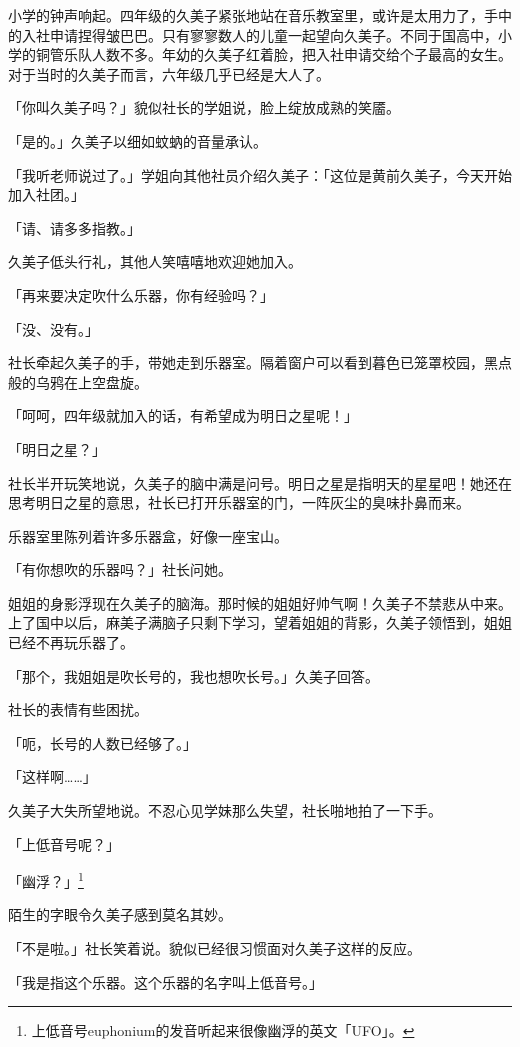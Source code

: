 \documentclass[UTF8]{ctexart}
\begin{document}
    小学的钟声响起。四年级的久美子紧张地站在音乐教室里，或许是太用力了，手中的入社申请捏得皱巴巴。只有寥寥数人的儿童一起望向久美子。不同于国高中，小学的铜管乐队人数不多。年幼的久美子红着脸，把入社申请交给个子最高的女生。对于当时的久美子而言，六年级几乎已经是大人了。 

    「你叫久美子吗？」貌似社长的学姐说，脸上绽放成熟的笑靥。 

    「是的。」久美子以细如蚊蚋的音量承认。 

    「我听老师说过了。」学姐向其他社员介绍久美子：「这位是黄前久美子，今天开始加入社团。」 

    「请、请多多指教。」 

    久美子低头行礼，其他人笑嘻嘻地欢迎她加入。 

    「再来要决定吹什么乐器，你有经验吗？」 

    「没、没有。」 

    社长牵起久美子的手，带她走到乐器室。隔着窗户可以看到暮色已笼罩校园，黑点般的乌鸦在上空盘旋。 

    「呵呵，四年级就加入的话，有希望成为明日之星呢！」 

    「明日之星？」 

    社长半开玩笑地说，久美子的脑中满是问号。明日之星是指明天的星星吧！她还在思考明日之星的意思，社长已打开乐器室的门，一阵灰尘的臭味扑鼻而来。 

    乐器室里陈列着许多乐器盒，好像一座宝山。 

    「有你想吹的乐器吗？」社长问她。 

    姐姐的身影浮现在久美子的脑海。那时候的姐姐好帅气啊！久美子不禁悲从中来。上了国中以后，麻美子满脑子只剩下学习，望着姐姐的背影，久美子领悟到，姐姐已经不再玩乐器了。 

    「那个，我姐姐是吹长号的，我也想吹长号。」久美子回答。 

    社长的表情有些困扰。 

    「呃，长号的人数已经够了。」 

    「这样啊……」 

    久美子大失所望地说。不忍心见学妹那么失望，社长啪地拍了一下手。 

    「上低音号呢？」 

    「幽浮？」\footnote{上低音号euphonium的发音听起来很像幽浮的英文「UFO」。}

    陌生的字眼令久美子感到莫名其妙。 

    「不是啦。」社长笑着说。貌似已经很习惯面对久美子这样的反应。 

    「我是指这个乐器。这个乐器的名字叫上低音号。」 
\end{document}
